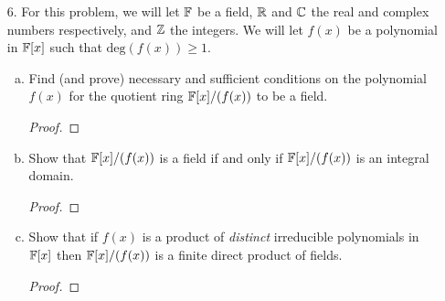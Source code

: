\begin{itemize}
\begin{enumerate}[(a)]
\begin{proof}
\medskip 
Like above, suppose for contradiction that $r \not\in \sqrt{I}$. Then there exists $P$ such that $P \bigcap S = \emptyset$. That is, $r \not\in P$
\end{proof}

\item Show that if $J := \bigcap_{j \in \Gamma} M_j$ then $x \in J$ if and only if $1+rx$ is a unit for all $r \in R$.
\begin{proof}
Maximal $\Rightarrow$ prime, so $J$ is nilpotent. By (e), thus $1+rx$ is a unit.

\medskip 

From Burr's HW $\#9$, an ideal $M$ is maximal iff for all $r \in R/M$ there exists an $x$ such that $1+rx \in M$. 
\textbf{INCOMPLETE}
\end{proof}

\item Show that if $x$ is a nilpotent element of $R$ then $1+rx$ is a unit for all $r \in R$.
\begin{proof}
It is easier to see that $1-rx$ is nilpotent: suppose that $x^n=0$ and expand 
$$(1-rx)(1 + rx + (rx)^2 + ... + (rn)^{n-1}).$$
\end{proof}
\end{enumerate}







\item[6.] For this problem, we will let $\mathbb{F}$ be a field, $\mathbb{R}$ and $\mathbb{C}$ the real and complex numbers
respectively, and $\mathbb{Z}$ the integers. We will let $f(x)$ be a polynomial in $\mathbb{F}[x]$ such that
$\text{deg}(f(x)) \geq 1$.
\begin{enumerate}[(a)]
\item Find (and prove) necessary and sufficient conditions on the polynomial
$f(x)$ for the quotient ring $\mathbb{F}[x]/(f(x))$ to be a field.
\begin{proof}

\end{proof}

\item Show that $\mathbb{F}[x]/(f(x))$ is a field if and only if $\mathbb{F}[x]/(f(x))$ is an integral
domain.
\begin{proof}

\end{proof}

\item Show that if $f(x)$ is a product of \textit{distinct} irreducible polynomials in
$\mathbb{F}[x]$ then $\mathbb{F}[x]/(f(x))$ is a finite direct product of fields.
\begin{proof}


\end{proof}
\end{enumerate}
\end{itemize}

